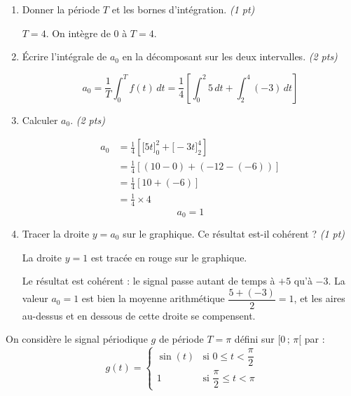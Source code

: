 \documentclass[a4paper,11pt]{article}
\begin{document}
\begin{enumerate}[label=\textbf{\arabic*.}]
  \item Donner la période $T$ et les bornes d'intégration. \hfill \textit{(1 pt)}
  \begin{tcolorbox}[corrigebox]
    $T = 4$. On intègre de $0$ à $T = 4$.
  \end{tcolorbox}

  \item Écrire l'intégrale de $a_0$ en la décomposant sur les deux intervalles. \hfill \textit{(2 pts)}
  \begin{tcolorbox}[corrigebox]
    \[
      a_0 = \frac{1}{T}\int_0^T f(t)\,dt = \frac{1}{4}\left[\int_0^2 5\,dt + \int_2^4 (-3)\,dt\right]
    \]
  \end{tcolorbox}

  \item Calculer $a_0$. \hfill \textit{(2 pts)}
  \begin{tcolorbox}[corrigebox]
    \begin{align*}
      a_0 &= \frac{1}{4}\left[\Big[5t\Big]_0^2 + \Big[-3t\Big]_2^4\right] \\
          &= \frac{1}{4}\left[(10 - 0) + (-12 -(-6))\right] \\
          &= \frac{1}{4}\left[10 + (-6)\right] \\
          &= \frac{1}{4}\times 4
    \end{align*}
    \[\boxed{a_0 = 1}\]
  \end{tcolorbox}

  \item Tracer la droite $y = a_0$ sur le graphique. Ce résultat est-il cohérent ? \hfill \textit{(1 pt)}
  \begin{tcolorbox}[corrigebox]
    La droite $y = 1$ est tracée en rouge sur le graphique.

    Le résultat est cohérent : le signal passe autant de temps à $+5$ qu'à $-3$. La valeur $a_0 = 1$ est bien la moyenne arithmétique $\dfrac{5+(-3)}{2} = 1$, et les aires au-dessus et en dessous de cette droite se compensent.
  \end{tcolorbox}
\end{enumerate}

\vspace{0.5cm}

\begin{tcolorbox}[exobox={Exercice 2 \hfill \normalfont\textit{(7 points)}}]
  On considère le signal périodique $g$ de période $T = \pi$ défini sur $[0\,;\,\pi[$ par :
  \[
    g(t) = \begin{cases} \sin(t) & \text{si } 0 \leq t < \dfrac{\pi}{2} \\[6pt] 1 & \text{si } \dfrac{\pi}{2} \leq t < \pi \end{cases}
  \]
\end{tcolorbox}
\end{document}
